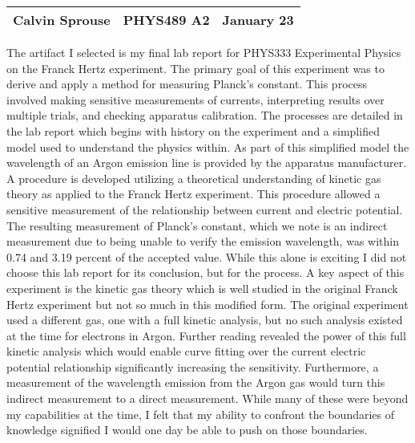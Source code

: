 \documentclass[a4paper, 12pt]{config/homework}
\begin{document}
\noindent
\begin{tabularx}{\textwidth}{>{\centering\arraybackslash}X>{\centering\arraybackslash}X>{\centering\arraybackslash}X}
Calvin Sprouse & PHYS489 A2 & 2024 January 23\\
\midrule
\end{tabularx}



The artifact I selected is my final lab report for PHYS333 Experimental Physics on the Franck Hertz experiment. The primary goal of this experiment was to derive and apply a method for measuring Planck's constant. This process involved making sensitive measurements of currents, interpreting results over multiple trials, and checking apparatus calibration. The processes are detailed in the lab report which begins with history on the experiment and a simplified model used to understand the physics within. As part of this simplified model the wavelength of an Argon emission line is provided by the apparatus manufacturer. A procedure is developed utilizing a theoretical understanding of kinetic gas theory as applied to the Franck Hertz experiment. This procedure allowed a sensitive measurement of the relationship between current and electric potential. The resulting measurement of Planck's constant, which we note is an indirect measurement due to being unable to verify the emission wavelength, was within 0.74 and 3.19 percent of the accepted value. While this alone is exciting I did not choose this lab report for its conclusion, but for the process. A key aspect of this experiment is the kinetic gas theory which is well studied in the original Franck Hertz experiment but not so much in this modified form. The original experiment used a different gas, one with a full kinetic analysis, but no such analysis existed at the time for electrons in Argon. Further reading revealed the power of this full kinetic analysis which would enable curve fitting over the current electric potential relationship significantly increasing the sensitivity. Furthermore, a measurement of the wavelength emission from the Argon gas would turn this indirect measurement to a direct measurement. While many of these were beyond my capabilities at the time, I felt that my ability to confront the boundaries of knowledge signified I would one day be able to push on those boundaries.


\end{document}
